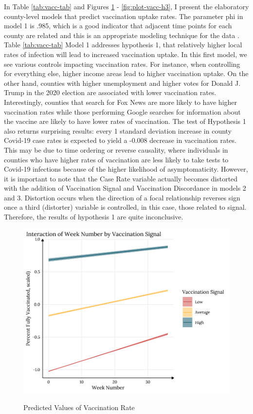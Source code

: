 In Table \ref{tab:vacc-tab} and Figures \ref{fig:plot-vacc-h2} -
\ref{fig:plot-vacc-h3}, I present the elaboratory county-level models that
predict vaccination uptake rates. The parameter phi in model 1 is .985, which is
a good indicator that adjacent time points for each county are related and this
is an appropriate modeling technique for the data \citep{finch_etal14}. Table
\ref{tab:vacc-tab} Model 1 addresses hypothesis 1, that relatively higher local
rates of infection will lead to increased vaccination uptake. In this first
model, we see various controls impacting vaccination rates. For instance, when
controlling for everything else, higher income areas lead to higher vaccination
uptake. On the other hand, counties with higher unemployment and higher votes
for Donald J. Trump in the 2020 election are associated with lower vaccination
rates. Interestingly, counties that search for Fox News are more likely to have
higher vaccination rates while those performing Google searches for information
about the vaccine are likely to have lower rates of vaccination. The test of
Hypothesis 1 also returns surprising results: every 1 standard deviation
increase in county Covid-19 case rates is expected to yield a -0.008 decrease in vaccination rates. This may be due to time ordering or reverse
causality, where individuals in counties who have higher rates of vaccination
are less likely to take tests to Covid-19 infections because of the higher
likelihood of asymptomaticity. However, it is important to note that the Case
Rate variable actually becomes distorted with the addition of Vaccination Signal
and Vaccination Discordance in models 2 and 3. Distortion occurs when the
direction of a focal relationship reverses sign once a third (distorter)
variable is controlled, in this case, those related to signal. Therefore, the
results of hypothesis 1 are quite inconclusive.

\begin{figure}
{\centering \includegraphics[width=0.8\linewidth]{figs/paper3/plot-vacc-h2-1}}
\caption{Predicted Values of Vaccination Rate}\label{fig:plot-vacc-h2}
\end{figure}

